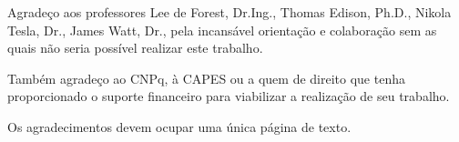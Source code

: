 
\noindent%
Agradeço aos professores Lee de Forest, Dr.Ing., Thomas Edison,
Ph.D., Nikola Tesla, Dr., James Watt, Dr., pela incansável orientação e colaboração sem as quais não seria possível realizar este trabalho.

\noindent%
Também agradeço ao CNPq, à CAPES ou a quem de direito que tenha proporcionado o suporte financeiro para viabilizar a realização de seu trabalho.

\noindent%
Os agradecimentos devem ocupar uma única página de texto.
\vfill